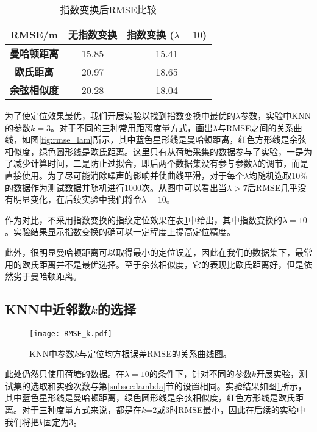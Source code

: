 \begin{table}[tbp]
	\caption{指数变换后RMSE比较}
	\begin{center}
		\begin{tabular}{ccc}
			\toprule
			\textbf{RMSE/m} & \textbf{无指数变换} & \textbf{指数变换 ($\lambda=10$)} \\
			\midrule
			\textbf{曼哈顿距离} & 15.85 & 15.41 \\
			\midrule
			\textbf{欧氏距离} & 20.97 & 18.65 \\
			\midrule
			\textbf{余弦相似度} & 20.28 & 18.04 \\
			\bottomrule
		\end{tabular}
		\label{tab:no_exp}
	\end{center}
\end{table}

为了使定位效果最优，我们开展实验以找到指数变换中最优的$\lambda$参数，实验中KNN的参数$k=3$。对于不同的三种常用距离度量方式，画出$\lambda$与RMSE之间的关系曲线，如图\ref{fig:rmse_lam}所示，其中蓝色星形线是曼哈顿距离，红色方形线是余弦相似度，绿色圆形线是欧氏距离。这里只有从荷塘采集的数据参与了实验，一是为了减少计算时间，二是防止过拟合，即后两个数据集没有参与参数$\lambda$的调节，而是直接使用。为了尽可能消除噪声的影响并使曲线平滑，对于每个$\lambda$均随机选取10\%的数据作为测试数据并随机进行1000次。从图中可以看出当$\lambda>7$后RMSE几乎没有明显变化，在后续实验中我们将令$\lambda=10$。

作为对比，不采用指数变换的指纹定位效果在表\ref{tab:no_exp}中给出，其中指数变换的$\lambda=10$。实验结果显示指数变换的确可以一定程度上提高定位精度。

此外，很明显曼哈顿距离可以取得最小的定位误差，因此在我们的数据集下，最常用的欧氏距离并不是最优选择。至于余弦相似度，它的表现比欧氏距离好，但是依然劣于曼哈顿距离。

\subsection{KNN中近邻数$k$的选择}

\begin{figure}[tb]
	\centering
	\texttt{[image: RMSE\_k.pdf]}
	\caption{KNN中参数$k$与定位均方根误差RMSE的关系曲线图。}
	\label{fig:rmse_k}
\end{figure}

此处仍然只使用荷塘的数据。在$\lambda=10$的条件下，针对不同的参数$k$开展实验，测试集的选取和实验次数与第\ref{subsec:lambda}节的设置相同。实验结果如图\ref{fig:rmse_k}所示，其中蓝色星形线是曼哈顿距离，绿色圆形线是余弦相似度，红色方形线是欧氏距离。对于三种度量方式来说，都是在$k$=2或3时RMSE最小，因此在后续的实验中我们将把$k$固定为3。


